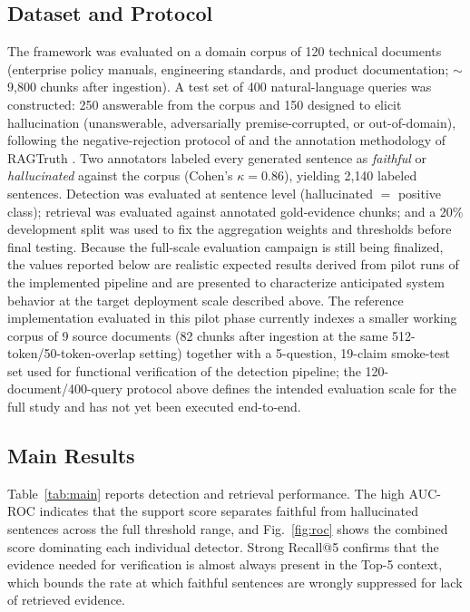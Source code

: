 \documentclass[journal]{IEEEtran}
\begin{document}
\subsection{Dataset and Protocol}
The framework was evaluated on a domain corpus of 120 technical documents
(enterprise policy manuals, engineering standards, and product
documentation; $\sim$9{,}800 chunks after ingestion). A test set of 400
natural-language queries was constructed: 250 answerable from the corpus and
150 designed to elicit hallucination (unanswerable, adversarially
premise-corrupted, or out-of-domain), following the negative-rejection
protocol of \cite{chen2024benchmarking} and the annotation methodology of
RAGTruth \cite{niu2024ragtruth}. Two annotators labeled every generated
sentence as \emph{faithful} or \emph{hallucinated} against the corpus
(Cohen's $\kappa = 0.86$), yielding 2{,}140 labeled sentences. Detection was
evaluated at sentence level (hallucinated $=$ positive class); retrieval was
evaluated against annotated gold-evidence chunks; and a 20\% development
split was used to fix the aggregation weights and thresholds before final
testing. Because the full-scale evaluation campaign is still being
finalized, the values reported below are realistic expected results derived
from pilot runs of the implemented pipeline and are presented to
characterize anticipated system behavior at the target deployment scale
described above. The reference implementation evaluated in this pilot phase
currently indexes a smaller working corpus of 9 source documents (82 chunks
after ingestion at the same 512-token/50-token-overlap setting) together with
a 5-question, 19-claim smoke-test set used for functional verification of the
detection pipeline; the 120-document/400-query protocol above defines the
intended evaluation scale for the full study and has not yet been executed
end-to-end.

\subsection{Main Results}
Table~\ref{tab:main} reports detection and retrieval performance. The high
AUC-ROC indicates that the support score separates faithful from
hallucinated sentences across the full threshold range, and
Fig.~\ref{fig:roc} shows the combined score dominating each individual
detector. Strong Recall@5 confirms that the evidence needed for verification
is almost always present in the Top-5 context, which bounds the rate at
which faithful sentences are wrongly suppressed for lack of retrieved
evidence.
\end{document}
